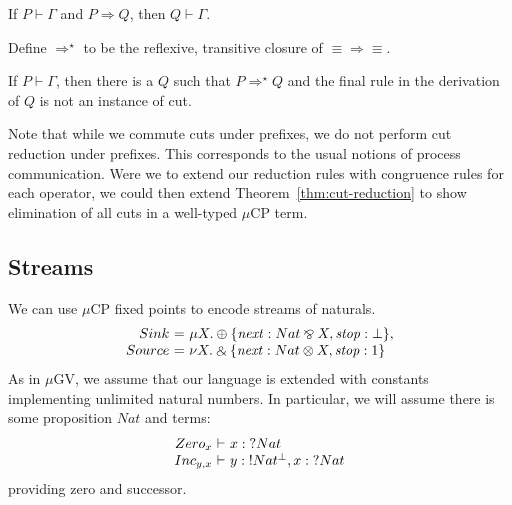\documentclass[orivec,envcountsame]{llncs}
\makeatletter
\newcommand{\with}{\mathbin\binampersand}
\newcommand{\parr}{\mathbin\bindnasrepma}
\newcommand{\cpdual}[1]{#1^\perp}
\newcommand{\cpbang}[1]{{! #1}}
\newcommand{\cpquery}[1]{{? #1}}
\newcommand{\cptyp}[2]{#1 \vdash #2}
\newcommand{\clabel}[1]{\mathit{#1}}
\newcommand{\mucp}{$\mu\mathrm{CP}$\xspace}
\newcommand{\mugv}{$\mu\mathrm{GV}$\xspace}
\newcommand{\ba}{\begin{array}}
\newcommand{\ea}{\end{array}}
\newenvironment{equations}{\[\ba{@{}r@{~}c@{~}l@{}}}{\ea\]}
\newenvironment{eqs}{\ba{@{}r@{~}c@{~}l@{}}}{\ea}
\makeatother
\begin{document}
\begin{theorem}
  If $\cptyp{P}{\Gamma}$ and $P \Longrightarrow Q$, then $\cptyp{Q}{\Gamma}.$
\end{theorem}

Define $\Longrightarrow^\star$ to be the reflexive, transitive closure of $\equiv\Longrightarrow\equiv$.

\begin{theorem}\label{thm:cut-reduction}
  If $\cptyp{P}{\Gamma}$, then there is a $Q$ such that $P \Longrightarrow^\star Q$ and the final
  rule in the derivation of $Q$ is not an instance of cut.
\end{theorem}

Note that while we commute cuts under prefixes, we do not perform cut reduction under prefixes.
This corresponds to the usual notions of process communication.  Were we to extend our reduction
rules with congruence rules for each operator, we could then extend Theorem~\ref{thm:cut-reduction}
to show elimination of all cuts in a well-typed \mucp term.

\subsection{Streams}

We can use \mucp fixed points to encode streams of naturals.
\begin{equations}
  Sink &=& \mu X. \oplus \{ \clabel{next}: Nat \parr X, \clabel{stop}: \bot \}, \\
  Source &=& \nu X. \with \{ \clabel{next}: Nat \otimes X, \clabel{stop}: 1 \} \\
\end{equations}%
As in \mugv, we assume that our language is extended with constants implementing unlimited
natural numbers. In particular, we will assume there is some proposition $Nat$ and terms:
\small\[
\begin{eqs}
Zero_x &\vdash& x:\cpquery{Nat} \\
Inc_{y,x} &\vdash& y:\cpbang{\cpdual{Nat}},x:\cpquery{Nat} \\
\end{eqs}
\]\normalsize
providing zero and successor.

\end{document}
